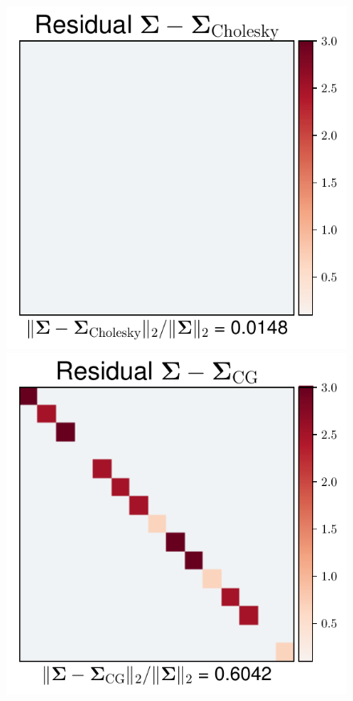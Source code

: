 \documentclass[nohypdvips,onefignum,onetabnum]{siamart171218}
\begin{document}
\begin{figure}
  \mbox{{\includegraphics[scale=0.4]{images/simu1_ex2_A_Chol.pdf}}}
  \mbox{{\includegraphics[scale=0.4]{images/simu1_ex2_A_CG.pdf}}}

\end{figure}
\end{document}
